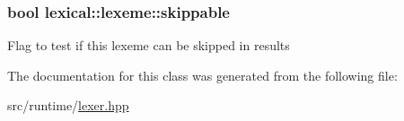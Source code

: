 \subsubsection[{\texorpdfstring{skippable}{skippable}}]{\setlength{\rightskip}{0pt plus 5cm}bool lexical\+::lexeme\+::skippable}\hypertarget{classlexical_1_1lexeme_accc3564ad951f163e3cf4dd8f93ede15}{}\label{classlexical_1_1lexeme_accc3564ad951f163e3cf4dd8f93ede15}
Flag to test if this lexeme can be skipped in results 

The documentation for this class was generated from the following file\+:\begin{DoxyCompactItemize}
\item 
src/runtime/\hyperlink{lexer_8hpp}{lexer.\+hpp}\end{DoxyCompactItemize}
